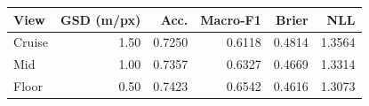 \begin{tabular}{lrrrrr}
\toprule
View & GSD (m/px) & Acc. & Macro-F1 & Brier & NLL \\
\midrule
Cruise & 1.50 & 0.7250 & 0.6118 & 0.4814 & 1.3564 \\
Mid & 1.00 & 0.7357 & 0.6327 & 0.4669 & 1.3314 \\
Floor & 0.50 & 0.7423 & 0.6542 & 0.4616 & 1.3073 \\
\bottomrule
\end{tabular}
